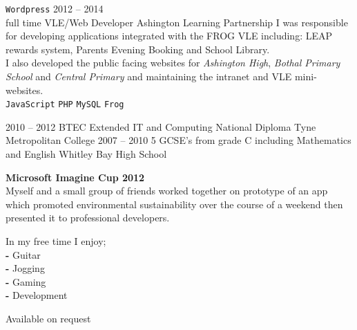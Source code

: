 \documentclass[9pt]{cv}
\begin{document}
\begin{entrylist}
{		\texttt{Wordpress}}
	\entry
		{2012 -- 2014\\\footnotesize{full time}}
		{VLE/Web Developer}
		{Ashington Learning Partnership}
		{I was responsible for developing applications integrated with the FROG VLE including: LEAP rewards system, Parents Evening Booking and School Library.\\
        I also developed the public facing websites for \textit{Ashington High}, \textit{Bothal Primary School} and \textit{Central Primary} and maintaining the intranet and VLE mini-websites.\\
		\texttt{JavaScript}\slashsep
		\texttt{PHP}\slashsep
		\texttt{MySQL}\slashsep
		\texttt{Frog}}
\end{entrylist}



\begin{entrylist}
	\entry
		{2010 -- 2012}
		{BTEC Extended IT and Computing National Diploma}
		{Tyne Metropolitan College}
		{}
	\entry
		{2007 -- 2010}
		{5 GCSE's from grade C including Mathematics and English}
		{Whitley Bay High School}
		{}
\end{entrylist}


\begin{minipage}[t]{0.4\textwidth}
	\vspace{-\baselineskip}
	

    \textbf{Microsoft Imagine Cup 2012}\\
	Myself and a small group of friends worked together on prototype of an app which promoted environmental sustainability over the course of a weekend then presented it to professional developers.
\end{minipage}
\hfill
\begin{minipage}[t]{0.2\textwidth}
	\vspace{-\baselineskip}
	
	
	In my free time I enjoy;\\
	\textbf{-} Guitar\\
	\textbf{-} Jogging\\
	\textbf{-} Gaming\\
	\textbf{-} Development
\end{minipage}
\hfill
\begin{minipage}[t]{0.2\textwidth}
	\vspace{-\baselineskip}

	
	Available on request
\end{minipage}

\end{document}
